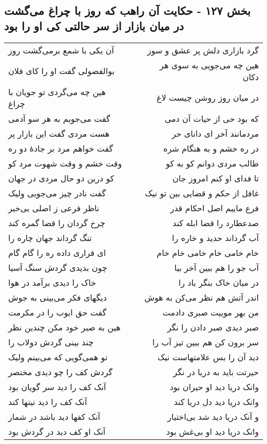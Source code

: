 \begin{center}
\section*{بخش ۱۲۷ - حکایت آن راهب که روز با چراغ می‌گشت در میان بازار از  سر حالتی کی او را بود}
\label{sec:sh127}
\begin{longtable}{l p{0.5cm} r}
آن یکی با شمع برمی‌گشت روز
&&
گرد بازاری دلش پر عشق و سوز
\\
بوالفضولی گفت او را کای فلان
&&
هین چه می‌جویی به سوی هر دکان
\\
هین چه می‌گردی تو جویان با چراغ
&&
در میان روز روشن چیست لاغ
\\
گفت می‌جویم به هر سو آدمی
&&
که بود حی از حیات آن دمی
\\
هست مردی گفت این بازار پر
&&
مردمانند آخر ای دانای حر
\\
گفت خواهم مرد بر جادهٔ دو ره
&&
در ره خشم و به هنگام شره
\\
وقت خشم و وقت شهوت مرد کو
&&
طالب مردی دوانم کو به کو
\\
کو درین دو حال مردی در جهان
&&
تا فدای او کنم امروز جان
\\
گفت نادر چیز می‌جویی ولیک
&&
غافل از حکم و قضایی بین تو نیک
\\
ناظر فرعی ز اصلی بی‌خبر
&&
فرع ماییم اصل احکام قدر
\\
چرخ گردان را قضا گمره کند
&&
صدعطارد را قضا ابله کند
\\
تنگ گرداند جهان چاره را
&&
آب گرداند حدید و خاره را
\\
ای قراری داده ره را گام گام
&&
خام خامی خام خامی خام خام
\\
چون بدیدی گردش سنگ آسیا
&&
آب جو را هم ببین آخر بیا
\\
خاک را دیدی برآمد در هوا
&&
در میان خاک بنگر باد را
\\
دیگهای فکر می‌بینی به جوش
&&
اندر آتش هم نظر می‌کن به هوش
\\
گفت حق ایوب را در مکرمت
&&
من بهر موییت صبری دادمت
\\
هین به صبر خود مکن چندین نظر
&&
صبر دیدی صبر دادن را نگر
\\
چند بینی گردش دولاب را
&&
سر برون کن هم ببین تیز آب را
\\
تو همی‌گویی که می‌بینم ولیک
&&
دید آن را بس علامتهاست نیک
\\
گردش کف را چو دیدی مختصر
&&
حیرتت باید به دریا در نگر
\\
آنک کف را دید سر گویان بود
&&
وانک دریا دید او حیران بود
\\
آنک کف را دید نیتها کند
&&
وانک دریا دید دل دریا کند
\\
آنک کفها دید باشد در شمار
&&
و آنک دریا دید شد بی‌اختیار
\\
آنک او کف دید در گردش بود
&&
وانک دریا دید او بی‌غش بود
\\
\end{longtable}
\end{center}
